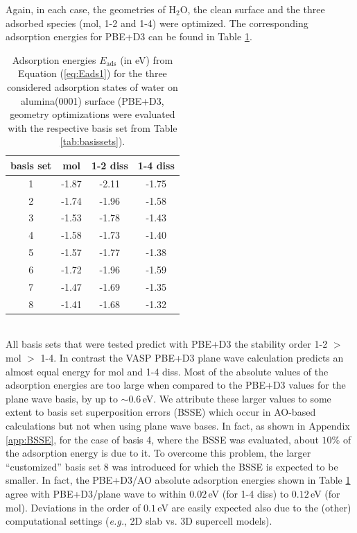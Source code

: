 \documentclass[11pt,DIV=13,BCOR=5mm,a4paper,headinclude]{scrbook}
\begin{document}
Again, in each case, the geometries of H$_2$O, the clean surface and the three adsorbed species (mol, 1-2 and 1-4) were optimized.
The corresponding adsorption energies for PBE+D3 can be found in Table \ref{tab:basisset-results-PBE+D3}.
\begin{table}[!h]
  \centering
   \caption{Adsorption energies $E_\textrm{ads}$ (in eV) from Equation (\ref{eq:Eads1}) for the three considered adsorption states of water on alumina(0001) surface (PBE+D3, geometry optimizations were evaluated with the respective basis set from Table \ref{tab:basissets}).}
  \begin{tabular}{c|ccc}
  \toprule
  basis set & mol & 1-2 diss & 1-4 diss \\\midrule
  1 &-1.87 &-2.11 &-1.75 \\
  2 &-1.74 &-1.96 &-1.58 \\
  3 &-1.53 &-1.78 &-1.43 \\
  4 &-1.58 &-1.73 &-1.40 \\
  5 &-1.57 &-1.77 &-1.38 \\
  6 &-1.72 &-1.96 &-1.59 \\
  7 &-1.47 &-1.69 &-1.35 \\
  8 &-1.41 &-1.68 &-1.32 \\\bottomrule  
  \end{tabular}
  \label{tab:basisset-results-PBE+D3}
\end{table}
\\

All basis sets that were tested predict with PBE+D3 the stability order 1-2 $>$ mol $>$ 1-4.
In contrast the VASP PBE+D3 plane wave calculation predicts an almost equal energy for mol and 1-4 diss.
Most of the absolute values of the adsorption energies are too large when compared to the PBE+D3 values for the plane wave basis, by up to $\sim0.6\,$eV.
We attribute these larger values to some extent to basis set superposition errors (BSSE) which occur in AO-based calculations but not when using plane wave bases.
In fact, as shown in Appendix \ref{app:BSSE}, for the case of basis 4, where the BSSE was evaluated, about $10\%$ of the adsorption energy is due to it.
To overcome this problem, the larger ``customized'' basis set 8 was introduced for which the BSSE is expected to be smaller.
In fact, the PBE+D3/AO absolute adsorption energies shown in Table \ref{tab:basisset-results-PBE+D3} agree with PBE+D3/plane wave to within $0.02\,$eV (for 1-4 diss) to $0.12\,$eV (for mol).
Deviations in the order of $0.1\,$eV are easily expected also due to the (other) computational settings (\textit{e.g.}, 2D slab vs. 3D supercell models).
\end{document}
